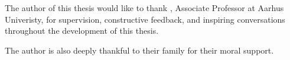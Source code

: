 The author of this thesis would like to thank \SupervisorName, Associate Professor at Aarhus Univeristy, for supervision, constructive feedback, and inspiring conversations throughout the development of this thesis. 
\vspace{1em}

\noindent The author is also deeply thankful to their family for their moral support. 